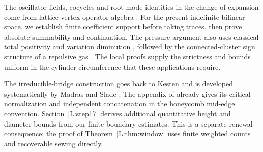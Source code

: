 The oscillator fields, cocycles and root-mode identities in the change
of expansion come from lattice vertex-operator algebra
\cite[Section~2.1]{Frenkel1985}. For the present indefinite bilinear
space, we establish finite coefficient support before taking traces,
then prove absolute summability and continuation. The pressure argument
also uses classical total positivity and variation diminution
\cite{Schoenberg1947}, followed by the connected-cluster sign structure
of a repulsive gas \cite[Sections~2.2--2.3]{ScottSokal2005}.
The local proofs supply the strictness and bounds uniform in the
cylinder circumference that these applications require.

The irreducible-bridge construction goes back to Kesten and is developed
systematically by Madras and Slade
\cite{Kesten1963,MadrasSlade1993}. The appendix of
\cite{BeatonEtAl2014} already gives its critical normalization and
independent concatenation in the honeycomb mid-edge convention.
Section~\ref{L:step17} derives additional quantitative height and diameter
bounds from our finite boundary estimates. This is a separate renewal
consequence: the proof of Theorem~\ref{L:thm:window} uses finite weighted
counts and recoverable sewing directly.
